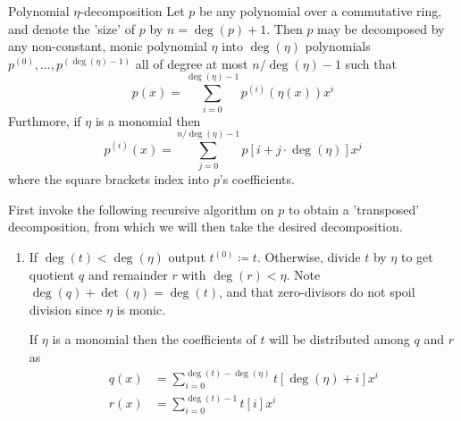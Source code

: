 
\begin{theorem}{Polynomial $\eta$-decomposition}
    Let $p$ be any polynomial over a commutative ring, and denote the 'size' of $p$ by $n=\deg(p)+1$.
    Then $p$ may be decomposed by any non-constant, monic polynomial $\eta$ into $\deg(\eta)$ polynomials $p^{(0)},\dots,p^{(\deg(\eta)-1)}$ all of degree at most $n/\deg(\eta)-1$ such that
    \begin{equation}
        p(x) = \sum_{i=0}^{\deg(\eta)-1} p^{(i)}(\eta(x))x^i
    \end{equation}
    Furthmore, if $\eta$ is a monomial then 
    \begin{equation}
        p^{(i)}(x) = \sum_{j=0}^{n/\deg(\eta)-1} p[i+j\cdot\deg(\eta)]x^j
    \end{equation}
    where the square brackets index into $p$'s coefficients.

    \proof
    First invoke the following recursive algorithm on $p$ to obtain a 'transposed' decomposition, from which we will then take the desired decomposition.

    \begin{enumerate}
        \begin{itemize}[square]
            \item
             polynomial $t$. Let $n_t=\det(t)+1$
            \item
             polynomials $t^{(0)},\dots,t^{(\ceil{n_t/\eta}-1)}$ with $\deg(t^{(i)})<\deg(\eta)$ for all $i$ such that
            \begin{align}
                t(x) = \sum_{i=0}^{\ceil{n_t/\deg(\eta)}-1} t^{(i)}(x)\eta(x)^i
            \end{align}
            Furthermore, if $\eta$ is a monomial then
            \begin{equation}
                t^{(i)} = \sum_{j=0}^{\deg(\eta)-1} t[j+i\cdot\deg(\eta)]x^j\tag{1}\label{t-form}
            \end{equation}
        \end{itemize}

        \item
        If $\deg(t)<\deg(\eta)$ output $t^{(0)}\coloneqq t$.
        Otherwise, divide $t$ by $\eta$ to get quotient $q$ and remainder $r$ with $\deg(r)<\eta$.
        Note $\deg(q)+\det(\eta) = \deg(t)$, and that zero-divisors do not spoil division since $\eta$ is monic.

        If $\eta$ is a monomial then the coefficients of $t$ will be distributed among $q$ and $r$ as
        \begin{align}
            q(x) &= \sum_{i=0}^{\deg(t)-\deg(\eta)} t[\deg(\eta)+i]x^i \tag{2}\label{q-form} \\
            r(x) &= \sum_{i=0}^{\deg(t)-1} t[i]x^i \tag{3}\label{r-form}
        \end{align}


\end{enumerate}
\end{theorem}
